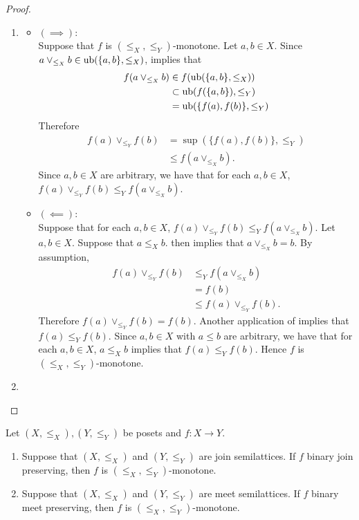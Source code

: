\documentclass{book}
\begin{document}
	\begin{proof}\
		\begin{enumerate}
			\item 
			\begin{itemize}
				\item $(\implies)$: \\
				Suppose that $f$ is $(\leq_X, \leq_Y)$-monotone. Let $a,b \in X$. Since $a \vee_{\leq_X} b \in \operatorname{ub}(\{a,b\}, \leq_X)$,  implies that  
				\begin{align*}
					f(a \vee_{\leq_X} b) 
					& \in f(\operatorname{ub}(\{a,b\}, \leq_X)) \\
					& \subset \operatorname{ub}(f(\{a,b\}), \leq_Y) \\
					& = \operatorname{ub}(\{f(a), f(b)\}, \leq_Y)
				\end{align*}
				Therefore
				\begin{align*}
					f(a) \vee_{\leq_Y} f(b)
					& = \sup (\{f(a), f(b)\}, \leq_Y) \\
					& \leq f(a \vee_{\leq_X} b).
				\end{align*}
				Since $a,b \in X$ are arbitrary, we have that for each $a,b \in X$, $f(a) \vee_{\leq_Y} f(b) \leq_Y f(a \vee_{\leq_X} b)$.
				\item $(\impliedby)$: \\
				Suppose that for each $a,b \in X$, $f(a) \vee_{\leq_Y} f(b) \leq_Y f(a \vee_{\leq_X} b)$. Let $a,b \in X$. Suppose that $a \leq_X b$.  then implies that $a \vee_{\leq_X} b = b$. By assumption, 
				\begin{align*}
					f(a) \vee_{\leq_Y} f(b) 
					& \leq_Y f(a \vee_{\leq_X} b) \\
					& = f(b) \\
					& \leq f(a) \vee_{\leq_Y} f(b).
				\end{align*}
				Therefore $f(a) \vee_{\leq_Y} f(b) = f(b)$. Another application of  implies that $f(a) \leq_Y f(b)$. Since $a,b \in X$ with $a \leq b$ are arbitrary, we have that for each $a,b \in X$, $a \leq_X b$ implies that $f(a) \leq_Y f(b)$. Hence $f$ is $(\leq_X, \leq_Y)$-monotone.
			\end{itemize}
			\item {}
		\end{enumerate}
	\end{proof}
	
	\begin{ex}
		Let $(X, \leq_X), (Y, \leq_Y)$ be posets and $f:X \rightarrow Y$. 
		\begin{enumerate}
			\item Suppose that $(X, \leq_X)$ and $(Y, \leq_Y)$ are join semilattices. If $f$ binary join preserving, then $f$ is $(\leq_X, \leq_Y)$-monotone.
			\item Suppose that $(X, \leq_X)$ and $(Y, \leq_Y)$ are meet semilattices. If $f$ binary meet preserving, then $f$ is $(\leq_X, \leq_Y)$-monotone.
		\end{enumerate}
	\end{ex}
	
\end{document}
